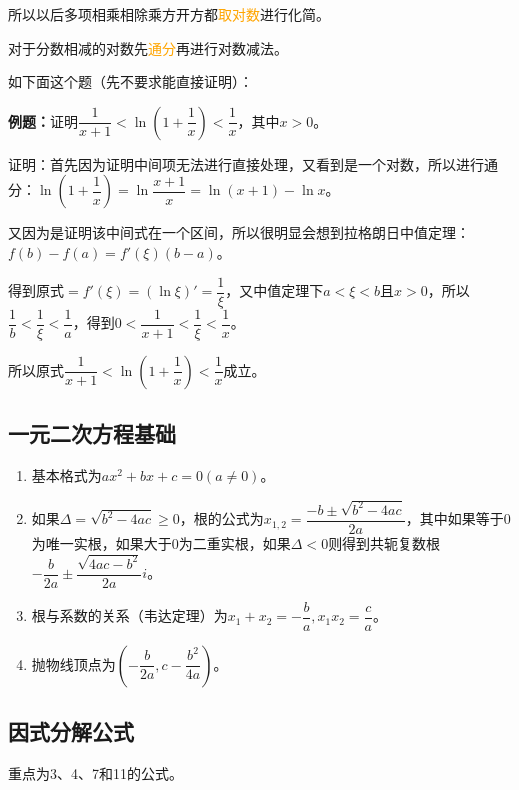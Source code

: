 \documentclass[UTF8, 12pt]{ctexart}
\begin{document}
        所以以后多项相乘相除乘方开方都\textcolor{orange}{取对数}进行化简。

        对于分数相减的对数先\textcolor{orange}{通分}再进行对数减法。

        如下面这个题（先不要求能直接证明）：

        \textbf{例题：}证明$\dfrac{1}{x+1}<\ln(1+\dfrac{1}{x})<\dfrac{1}{x}$，其中$x>0$。

        证明：首先因为证明中间项无法进行直接处理，又看到是一个对数，所以进行通分：$\ln(1+\dfrac{1}{x})=\ln\dfrac{x+1}{x}=\ln(x+1)-\ln x$。

        又因为是证明该中间式在一个区间，所以很明显会想到拉格朗日中值定理：$f(b)-f(a)=f'(\xi)(b-a)$。

        得到原式$=f'(\xi)=(\ln\xi)'=\dfrac{1}{\xi}$，又中值定理下$a<\xi<b$且$x>0$，所以$\dfrac{1}{b}<\dfrac{1}{\xi}<\dfrac{1}{a}$，得到$0<\dfrac{1}{x+1}<\dfrac{1}{\xi}<\dfrac{1}{x}$。

        所以原式$\dfrac{1}{x+1}<\ln(1+\dfrac{1}{x})<\dfrac{1}{x}$成立。

        \subsection{一元二次方程基础}

        \begin{enumerate}
            \item 基本格式为$ax^2+bx+c=0(a\neq 0)$。
            \item 如果$\Delta=\sqrt{b^2-4ac}\geqslant 0$，根的公式为$x_{1,2}=\dfrac{-b\pm\sqrt{b^2-4ac}}{2a}$，其中如果等于0为唯一实根，如果大于0为二重实根，如果$\Delta<0$则得到共轭复数根$-\dfrac{b}{2a}\pm\dfrac{\sqrt{4ac-b^2}}{2a}i$。
            \item 根与系数的关系（韦达定理）为$x_1+x_2=-\dfrac{b}{a},x_1x_2=\dfrac{c}{a}$。
            \item 抛物线顶点为$(-\dfrac{b}{2a},c-\dfrac{b^2}{4a})$。
        \end{enumerate}

        \subsection{因式分解公式}

        重点为3、4、7和11的公式。
\end{document}
